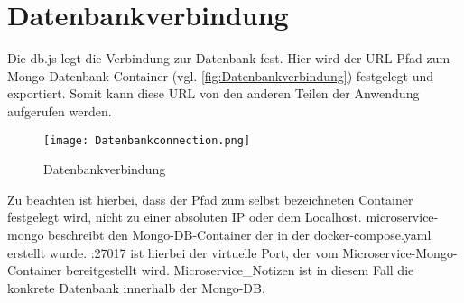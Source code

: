 
\chapter{Datenbankverbindung}
\label{ch:Datenbankverbindung}
Die db.js legt die Verbindung zur Datenbank fest. Hier wird der URL-Pfad zum Mongo-Datenbank-Container (vgl. \autoref{fig:Datenbankverbindung}) festgelegt und exportiert. Somit kann diese URL von den anderen Teilen der Anwendung aufgerufen werden. 

\begin{figure}[h]
\texttt{[image: Datenbankconnection.png]}
\vspace{1pt}
\caption{Datenbankverbindung}
\label{fig:Datenbankverbindung}
\end{figure}

Zu beachten ist hierbei, dass der Pfad zum selbst bezeichneten Container festgelegt wird, nicht zu einer absoluten IP oder dem Localhost. \glqq  microservice-mongo\grqq{} beschreibt den Mongo-DB-Container der in der \glqq docker-compose.yaml\grqq{} erstellt wurde. \glqq  :27017\grqq{} ist hierbei der virtuelle Port, der vom Microservice-Mongo-Container bereitgestellt wird. \glqq  Microservice\_Notizen\grqq{} ist in diesem Fall die konkrete Datenbank innerhalb der Mongo-DB.


